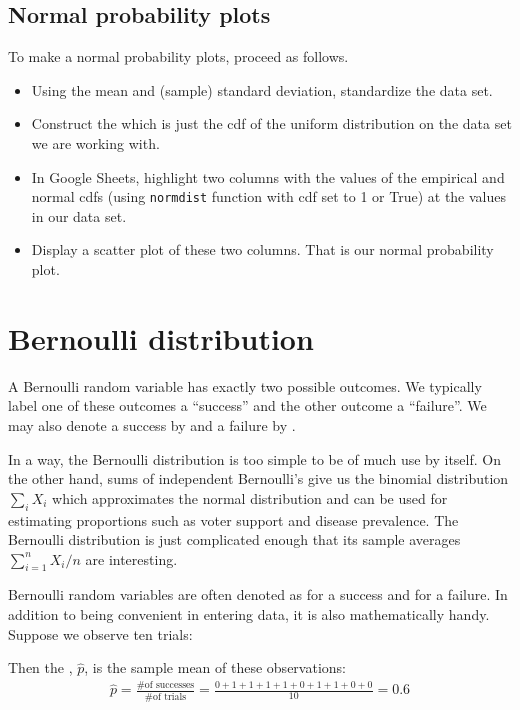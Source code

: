 \subsection{Normal probability plots}
\label{assessingNormal}


To make a normal probability plots, proceed as follows.
\begin{itemize}
\item Using the mean and (sample) standard deviation, standardize the data set.
\item Construct the  which is just the cdf of the uniform distribution on the data set we are working with.
\item In Google Sheets, highlight two columns with the values of the empirical and normal cdfs (using \texttt{normdist} function with cdf set to 1 or True) at the values in our data set.
\item Display a scatter plot of these two columns. That is our normal probability plot.
\end{itemize}


\section{Bernoulli distribution}
\label{bernoulli}


\begin{termBox}{
A Bernoulli random variable has exactly two possible outcomes. We typically label one of these outcomes a ``success'' and the other outcome a ``failure''. We may also denote a success by  and a failure by .}
\end{termBox}

In a way, the Bernoulli distribution is too simple to be of much use by itself. On the other hand, sums of independent Bernoulli's give us the binomial distribution $\sum_i X_i$ which approximates the normal distribution and can be used for estimating proportions such as voter support and disease prevalence. The Bernoulli distribution is just complicated enough that its sample averages $\sum_{i=1}^n X_i/n$ are interesting.

Bernoulli random variables are often denoted as  for a success and  for a failure. In addition to being convenient in entering data, it is also mathematically handy. Suppose we observe ten trials:
\begin{center}
         
\end{center}
Then the , $\hat{p}$, is the sample mean of these observations:
\begin{eqnarray*}
\hat{p} = \frac{\text{\# of successes}}{\text{\# of trials}} = \frac{0+1+1+1+1+0+1+1+0+0}{10} = 0.6
\end{eqnarray*}%

